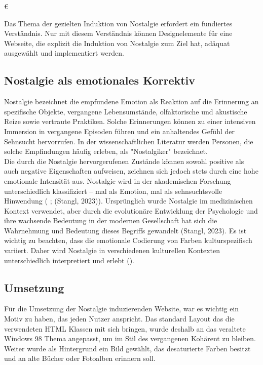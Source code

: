 €\documentclass[./dokumentation.tex]{subfiles}
\begin{document}
Das Thema der gezielten Induktion von Nostalgie erfordert ein fundiertes Verständnis. Nur mit diesem Verständnis können Designelemente für eine Webseite, die explizit die Induktion von Nostalgie zum Ziel hat, adäquat ausgewählt und implementiert werden.

\subsection{Nostalgie als emotionales Korrektiv}
Nostalgie bezeichnet die empfundene Emotion als Reaktion auf die Erinnerung an spezifische Objekte, vergangene Lebensumstände, olfaktorische und akustische Reize sowie vertraute Praktiken. Solche Erinnerungen können zu einer intensiven Immersion in vergangene Episoden führen und ein anhaltendes Gefühl der Sehnsucht hervorrufen. In der wissenschaftlichen Literatur werden Personen, die solche Empfindungen häufig erleben, als "Nostalgiker" bezeichnet. \\

Die durch die Nostalgie hervorgerufenen Zustände können sowohl positive als auch negative Eigenschaften aufweisen, zeichnen sich jedoch stets durch eine hohe emotionale Intensität aus. Nostalgie wird in der akademischen Forschung unterschiedlich klassifiziert – mal als Emotion, mal als sehnsuchtsvolle Hinwendung (\cite{Hepper2011} ; (Stangl, 2023)). Ursprünglich wurde Nostalgie im medizinischen Kontext verwendet, aber durch die evolutionäre Entwicklung der Psychologie und ihre wachsende Bedeutung in der modernen Gesellschaft hat sich die Wahrnehmung und Bedeutung dieses Begriffs gewandelt (Stangl, 2023). Es ist wichtig zu beachten, dass die emotionale Codierung von Farben kulturspezifisch variiert. Daher wird Nostalgie in verschiedenen kulturellen Kontexten unterschiedlich interpretiert und erlebt (\cite{Roberson2006}).\\

\subsection{Umsetzung}

Für die Umsetzung der Nostalgie induzierenden Website, war es wichtig ein Motiv zu haben, das jeden Nutzer anspricht. Das standard Layout das die verwendeten HTML Klassen mit sich bringen, wurde deshalb an das veraltete Windows 98 Thema angepasst, um im Stil des vergangenen Kohärent zu bleiben. Weiter wurde als Hintergrund ein Bild gewählt, das desaturierte Farben besitzt und an alte Bücher oder Fotoalben erinnern soll. 
\end{document}
